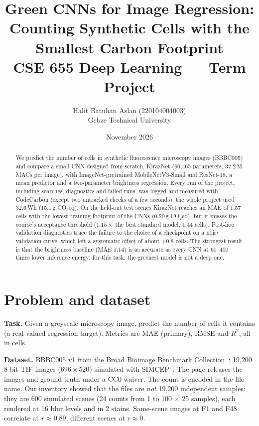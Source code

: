 \documentclass[11pt,a4paper]{article}
\title{\textbf{Green CNNs for Image Regression:\\Counting Synthetic Cells with the Smallest Carbon Footprint}\\[4pt]
\large CSE 655 Deep Learning --- Term Project}
\author{Halit Batuhan Aslan \quad (220104004003)\\Gebze Technical University}
\date{November 2026}
\newcommand{\kn}{KirazNet}
\begin{document}
\maketitle

\begin{abstract}
We predict the number of cells in synthetic fluorescence microscopy images (BBBC005) and compare a
small CNN designed from scratch, \kn{} (60{,}465 parameters, 37.2\,M MACs per image), with
ImageNet-pretrained MobileNetV3-Small and ResNet-18, a mean predictor and a two-parameter
brightness regression. Every run of the project, including searches, diagnostics and failed runs,
was logged and measured with CodeCarbon (except two untracked checks of a few seconds); the whole project used 32.6\,Wh (15.1\,g CO$_2$eq). On the held-out
test scenes \kn{} reaches an MAE of 1.57 cells with the lowest training footprint of the CNNs
(0.20\,g CO$_2$eq), but it misses the course's acceptance threshold
($1.15\times$ the best standard model, 1.44 cells). Post-hoc validation diagnostics trace the failure
to the choice of a checkpoint on a noisy validation curve, which left a systematic offset of about
+0.8 cells. The strongest result is that the brightness baseline (MAE 1.14) is as accurate as every
CNN at 60--400 times lower inference energy: for this task, the greenest model is not a deep one.
\end{abstract}

\section{Problem and dataset}

\textbf{Task.} Given a greyscale microscopy image, predict the number of cells it contains (a
real-valued regression target). Metrics are MAE (primary), RMSE and $R^2$, all in cells.

\textbf{Dataset.} BBBC005 v1 from the Broad Bioimage Benchmark Collection~\cite{ljosa2012}: 19{,}200
8-bit TIF images ($696\times520$) simulated with SIMCEP~\cite{lehmussola2007}. The page releases the
images and ground truth under a CC0 waiver. The count is encoded in the file name. Our inventory
showed that the files are \emph{not} 19{,}200 independent samples: they are 600 simulated scenes
(24 counts from 1 to 100 $\times$ 25 samples), each rendered at 16 blur levels and in 2 stains.
Same-scene images at F1 and F48 correlate at $r\approx0.89$, different scenes at $r\approx0$.
\end{document}

